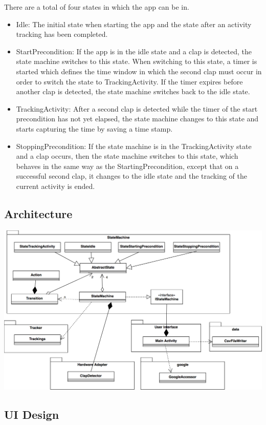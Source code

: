 \documentclass
[
 12pt, %
       DIV12,
       a4paper,
       oneside,
       titlepage,
       parskip=half,
       headings=normal,
       listof=totoc,
       bibliography=totoc,
       index=totoc,
       captions=tableheading,
       ]{scrreprt}
\begin{document}
There are a total of four states in which the app can be in. 
\begin{itemize}
\item Idle: The initial state when starting the app and the state after an activity tracking has been completed.
\item StartPrecondition: If the app is in the idle state and a clap is detected, the state machine switches to this state. When switching to this state, a timer is started which defines the time window in which the second clap must occur in order to switch the state to TrackingActivity. If the timer expires before another clap is detected, the state machine switches back to the idle state.
\item TrackingActivity: After a second clap is detected while the timer of the start precondition has not yet elapsed, the state machine changes to this state and starts capturing the time by saving a time stamp.
\item StoppingPrecondition: If the state machine is in the TrackingActivity state and a clap occurs, then the state machine switches to this state, which behaves in the same way as the StartingPrecondition, except that on a successful second clap, it changes to the idle state and the tracking of the current activity is ended.
\end{itemize}

\subsection{Architecture}
\label{sec:orga3fb9a6}

\begin{center}
\includegraphics[width=.9\linewidth]{./imgs/classUML.png}
\end{center}

\subsection{UI Design}
\label{sec:orgd655d2f}
\end{document}
